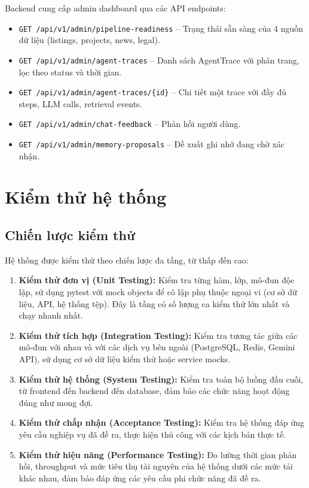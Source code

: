 Backend cung cấp admin dashboard qua các API endpoints:

\begin{itemize}
    \item \texttt{GET /api/v1/admin/pipeline-readiness} -- Trạng thái sẵn sàng của 4 nguồn dữ liệu (listings, projects, news, legal).
    \item \texttt{GET /api/v1/admin/agent-traces} -- Danh sách AgentTrace với phân trang, lọc theo status và thời gian.
    \item \texttt{GET /api/v1/admin/agent-traces/\{id\}} -- Chi tiết một trace với đầy đủ steps, LLM calls, retrieval events.
    \item \texttt{GET /api/v1/admin/chat-feedback} -- Phản hồi người dùng.
    \item \texttt{GET /api/v1/admin/memory-proposals} -- Đề xuất ghi nhớ đang chờ xác nhận.
\end{itemize}

\section{Kiểm thử hệ thống}

\subsection{Chiến lược kiểm thử}

Hệ thống được kiểm thử theo chiến lược đa tầng, từ thấp đến cao:

\begin{enumerate}
    \item \textbf{Kiểm thử đơn vị (Unit Testing):} Kiểm tra từng hàm, lớp, mô-đun độc lập, sử dụng pytest với mock objects để cô lập phụ thuộc ngoại vi (cơ sở dữ liệu, API, hệ thống tệp). Đây là tầng có số lượng ca kiểm thử lớn nhất và chạy nhanh nhất.

    \item \textbf{Kiểm thử tích hợp (Integration Testing):} Kiểm tra tương tác giữa các mô-đun với nhau và với các dịch vụ bên ngoài (PostgreSQL, Redis, Gemini API), sử dụng cơ sở dữ liệu kiểm thử hoặc service mocks.

    \item \textbf{Kiểm thử hệ thống (System Testing):} Kiểm tra toàn bộ luồng đầu cuối, từ frontend đến backend đến database, đảm bảo các chức năng hoạt động đúng như mong đợi.

    \item \textbf{Kiểm thử chấp nhận (Acceptance Testing):} Kiểm tra hệ thống đáp ứng yêu cầu nghiệp vụ đã đề ra, thực hiện thủ công với các kịch bản thực tế.

    \item \textbf{Kiểm thử hiệu năng (Performance Testing):} Đo lường thời gian phản hồi, throughput và mức tiêu thụ tài nguyên của hệ thống dưới các mức tải khác nhau, đảm bảo đáp ứng các yêu cầu phi chức năng đã đề ra.
\end{enumerate}

